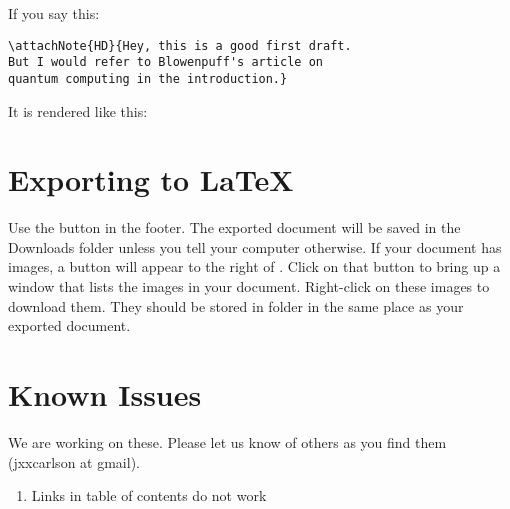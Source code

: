 If you say this:

\begin{verbatim}
\attachNote{HD}{Hey, this is a good first draft.
But I would refer to Blowenpuff's article on
quantum computing in the introduction.}
\end{verbatim}

It is rendered like this:


\section{Exporting to LaTeX}

Use the  button in the footer.  The exported document will be saved in the Downloads folder unless you tell your computer otherwise.  If your document has images, a button  will appear to the right of .  Click on that button to bring up a window that lists the images in your document.  Right-click on these images to download them.  They should be stored in folder  in the same place as your exported document.


\section{Known Issues}

We are working on these.  Please let us know of others as you find them (jxxcarlson at gmail).

\begin{enumerate}

\item Links in table of contents do not work

\end{enumerate}

